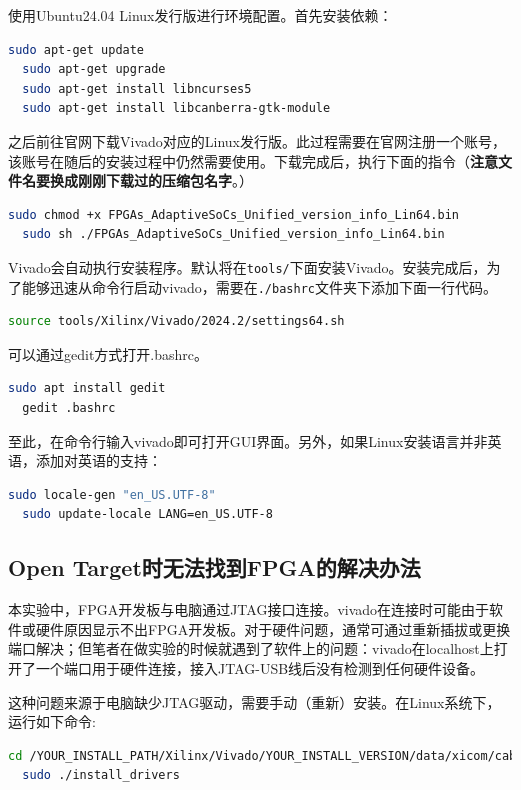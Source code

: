 \documentclass[lang=cn,newtx,10pt,scheme=chinese]{elegantbook}
\begin{document}
使用Ubuntu24.04 Linux发行版进行环境配置。首先安装依赖：
\begin{lstlisting}[language=bash]
  sudo apt-get update
  sudo apt-get upgrade
  sudo apt-get install libncurses5
  sudo apt-get install libcanberra-gtk-module  
\end{lstlisting}

之后前往官网下载Vivado对应的Linux发行版。此过程需要在官网注册一个账号，该账号在随后的安装过程中仍然需要使用。下载完成后，执行下面的指令（\textbf{注意文件名要换成刚刚下载过的压缩包名字}。）
\begin{lstlisting}[language=bash]
  sudo chmod +x FPGAs_AdaptiveSoCs_Unified_version_info_Lin64.bin
  sudo sh ./FPGAs_AdaptiveSoCs_Unified_version_info_Lin64.bin
\end{lstlisting}

Vivado会自动执行安装程序。默认将在\texttt{tools/}下面安装Vivado。安装完成后，为了能够迅速从命令行启动vivado，需要在\texttt{./bashrc}文件夹下添加下面一行代码。
\begin{lstlisting}[language=bash]
  source tools/Xilinx/Vivado/2024.2/settings64.sh
\end{lstlisting}

可以通过gedit方式打开.bashrc。
\begin{lstlisting}[language=bash]
  sudo apt install gedit
  gedit .bashrc
\end{lstlisting}

至此，在命令行输入vivado即可打开GUI界面。另外，如果Linux安装语言并非英语，添加对英语的支持：
\begin{lstlisting}[language=bash]
  sudo locale-gen "en_US.UTF-8"
  sudo update-locale LANG=en_US.UTF-8
\end{lstlisting}

\subsection{Open Target时无法找到FPGA的解决办法}
本实验中，FPGA开发板与电脑通过JTAG接口连接。vivado在连接时可能由于软件或硬件原因显示不出FPGA开发板。对于硬件问题，通常可通过重新插拔或更换端口解决；但笔者在做实验的时候就遇到了软件上的问题：vivado在localhost上打开了一个端口用于硬件连接，接入JTAG-USB线后没有检测到任何硬件设备。

这种问题来源于电脑缺少JTAG驱动，需要手动（重新）安装。在Linux系统下，运行如下命令:
\begin{lstlisting}[language=bash]
  cd /YOUR_INSTALL_PATH/Xilinx/Vivado/YOUR_INSTALL_VERSION/data/xicom/cable_drivers/lin64/install_script/install_drivers
  sudo ./install_drivers
\end{lstlisting}
\end{document}
